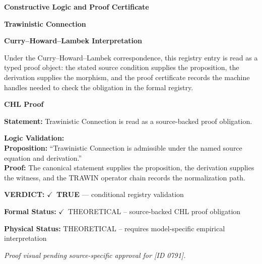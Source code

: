 \clearpage
\begingroup\tzpsupportsetup
\noindent\textbf{\fontsize{10.8pt}{12.8pt}\selectfont [ID 0791] Constructive Logic and Proof Certificate}\par
\noindent\textbf{\fontsize{10pt}{12pt}\selectfont Trawinistic Connection}\par
\vspace{0.45em}
\begingroup
\footnotesize
\setlength{\parskip}{0.22em}
\setlength{\parindent}{0pt}
\noindent\textbf{Curry--Howard--Lambek Interpretation}\par
Under the Curry--Howard--Lambek correspondence, this registry entry is read as a typed proof
object: the stated source condition supplies the proposition, the derivation supplies the
morphism, and the proof certificate records the machine handles needed to check the obligation
in the formal registry.

\vspace{0.45em}
\noindent\textbf{CHL Proof}\par
\textbf{Statement:} Trawinistic Connection is read as a source-backed proof obligation.

\textbf{Logic Validation:}\\
\textbf{Proposition:} ``Trawinistic Connection is admissible under the named source equation and derivation.''\\
\textbf{Proof:} The canonical statement supplies the proposition, the derivation supplies the witness, and the TRAWIN operator chain records the normalization path.

\textbf{VERDICT:} \ensuremath{\checkmark}\ \textbf{TRUE} --- conditional registry validation

\textbf{Formal Status:} \ensuremath{\checkmark}\ THEORETICAL -- source-backed CHL proof obligation

\textbf{Physical Status:} THEORETICAL -- requires model-specific empirical interpretation
\par\vspace{0.45em}
\par
\vfill
\begingroup\footnotesize\itshape
Proof visual pending source-specific approval for [ID 0791].
\par\endgroup
\vfill
\endgroup
\endgroup
